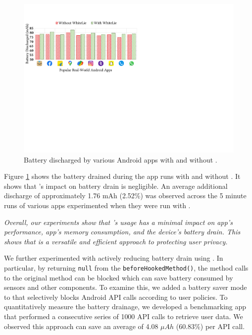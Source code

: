 \begin{figure}[t]
    \includegraphics[width=\linewidth]{Figures/Performance Evaluation/results_battery_discharged_real_world_apps.pdf}
    \caption{Battery discharged by various Android apps with and without \framework{}.}
    \label{fig:reslts_btryDschrgd}
\end{figure}

Figure \ref{fig:reslts_btryDschrgd} shows the battery drained during the 
app runs with and without \framework. It shows that \framework's impact on
battery drain is negligible. An average additional discharge of approximately
1.76 mAh (2.52\%) was observed across the 5 minute runs of various apps experimented when
they were run with \framework. 

\textit{Overall, our experiments show that \framework's usage has a minimal impact on
app's performance, app's memory consumption, and the device's battery drain. 
This shows that \framework is a versatile and efficient approach to protecting
user privacy.}

We further experimented with actively reducing battery drain using \framework{}.
In particular, by returning \texttt{null} from the
\texttt{beforeHookedMethod()}, the method calls to the original method can be
blocked which can save battery consumed by sensors and other components. To 
examine this, we added a battery saver mode to \framework{} that selectively
blocks Android API calls according to user policies. 
To quantitatively measure the battery drainage, we developed a benchmarking app that performed a consecutive series of 1000 API calls to retrieve user data.
We observed this approach can save an average of 4.08 $\mu{}Ah$
(60.83\%) per API call.


